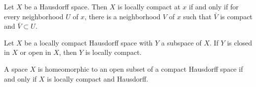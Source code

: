     \begin{lemma}
    Let $X$ be a Hausdorff space. Then $X$ is locally compact at $x$ if and only if for every neighborhood $U$ of $x$, there is a neighborhood $V$ of $x$ such that $\bar{V}$ is compact and $\bar{V} \subset U$. 
    \end{lemma}

    \begin{corollary}
    Let $X$ be a locally compact Hausdorff space with $Y$ a subspace of $X$. If $Y$ is closed in $X$ or open in $X$, then $Y$ is locally compact. 
    \end{corollary}

    \begin{corollary}
    A space $X$ is homeomorphic to an open subset of a compact Hausdorff space if and only if $X$ is locally compact and Hausdorff. 
    \end{corollary}
